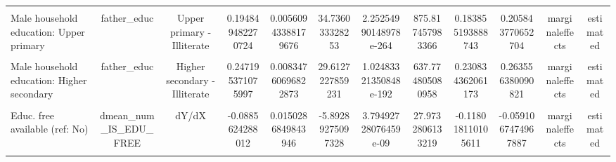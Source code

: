 \begin{table}
\begin{tabular}[t]{lccccccccccc}
\cellcolor{gray!10}{Male household education: Primary} & \cellcolor{gray!10}{father\_educ} & \cellcolor{gray!10}{Primary - Illiterate} & \cellcolor{gray!10}{0.142074648481352} & \cellcolor{gray!10}{0.00540245790414184} & \cellcolor{gray!10}{26.2981500276808} & \cellcolor{gray!10}{2.01346274766487e-152} & \cellcolor{gray!10}{503.923391642553} & \cellcolor{gray!10}{0.13148602556124} & \cellcolor{gray!10}{0.152663271401464} & \cellcolor{gray!10}{marginaleffects} & \cellcolor{gray!10}{estimated}\\
Male household education: Upper primary & father\_educ & Upper primary - Illiterate & 0.194849482270724 & 0.00560943388179676 & 34.736033328253 & 2.25254990148978e-264 & 875.817457983366 & 0.183855193888743 & 0.205843770652704 & marginaleffects & estimated\\
\cellcolor{gray!10}{Male household education: Secondary} & \cellcolor{gray!10}{father\_educ} & \cellcolor{gray!10}{Secondary - Illiterate} & \cellcolor{gray!10}{0.211531931987045} & \cellcolor{gray!10}{0.00712908350593515} & \cellcolor{gray!10}{29.6716866636419} & \cellcolor{gray!10}{1.78124214293304e-193} & \cellcolor{gray!10}{640.299238662816} & \cellcolor{gray!10}{0.197559185072634} & \cellcolor{gray!10}{0.225504678901456} & \cellcolor{gray!10}{marginaleffects} & \cellcolor{gray!10}{estimated}\\
Male household education: Higher secondary & father\_educ & Higher secondary - Illiterate & 0.247195371075997 & 0.00834760696822873 & 29.6127227859231 & 1.02483321350848e-192 & 637.774805080958 & 0.230834362061173 & 0.263556380090821 & marginaleffects & estimated\\
\cellcolor{gray!10}{Male household education: Postsecondary+} & \cellcolor{gray!10}{father\_educ} & \cellcolor{gray!10}{Postsecondary+ - Illiterate} & \cellcolor{gray!10}{0.245206524043896} & \cellcolor{gray!10}{0.00893706960709748} & \cellcolor{gray!10}{27.4370162507364} & \cellcolor{gray!10}{9.92628852173024e-166} & \cellcolor{gray!10}{548.128809362069} & \cellcolor{gray!10}{0.227690189486658} & \cellcolor{gray!10}{0.262722858601135} & \cellcolor{gray!10}{marginaleffects} & \cellcolor{gray!10}{estimated}\\
Educ. free available (ref: No) & dmean\_num\_IS\_EDU\_FREE & dY/dX & -0.0885624288012 & 0.0150286849843946 & -5.89289275097328 & 3.79492728076459e-09 & 27.9732806133219 & -0.118018110105611 & -0.0591067474967887 & marginaleffects & estimated\\
\cellcolor{gray!10}{Tuition waiver received} & \cellcolor{gray!10}{dmean\_num\_TUTION\_FEE\_WAIVED} & \cellcolor{gray!10}{dY/dX} & \cellcolor{gray!10}{-0.0833439210129783} & \cellcolor{gray!10}{0.0547914673641704} & \cellcolor{gray!10}{-1.52111131572795} & \cellcolor{gray!10}{0.128231905289878} & \cellcolor{gray!10}{2.96317283233232} & \cellcolor{gray!10}{-0.190733223706854} & \cellcolor{gray!10}{0.0240453816808974} & \cellcolor{gray!10}{marginaleffects} & \cellcolor{gray!10}{estimated}\\

\end{tabular}
\end{table}
